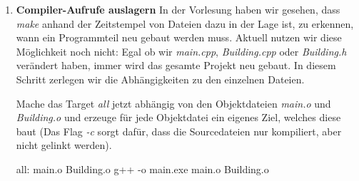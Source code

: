\begin{enumerate}
\begin{minipage}[t]{.45\textwidth}
\begin{lstlisting}
/*
* File: Building.h
*/
#ifndef BUILDING_H_
#define BUILDING_H_

#include <string>

class Building {
public:
    Building(unsigned int numFloors);
    const std::string toString() const;
private:
    unsigned int numFloors;
};
#endif
\end{lstlisting}
\end{minipage}
\begin{minipage}[t]{.45\textwidth}
\begin{lstlisting}
/*
* File: Building.cpp
*/
#include "Building.h"

#include <string>
#include <sstream>

using namespace std;

Building::Building(unsigned int numFloors) :
    numFloors(numFloors) {}

const std::string Building::toString() const{
    stringstream output;
    output << "A building with "
           << this->numFloors
           << " floors\n";
    return output.str();
}
\end{lstlisting}
\end{minipage}

Erzeuge in \emph{main} eine zweistöckige Instanz von \emph{Building} und gib diese mittels \emph{Building::toString} auf der Konsole aus.

Damit das Projekt kompiliert, muss auch \emph{Building} im Makefile eingetragen werden.
Passe dazu den Compileraufruf an:
\begin{lstmake}
all:
    g++ -o main.exe main.cpp Building.cpp
\end{lstmake}

Wenn du das Projekt gebaut hast, sollte auf der Konsole eine Ausgabe deines Gebäudes erscheinen.

\item\textbf{Compiler-Aufrufe auslagern}
In der Vorlesung haben wir gesehen, dass \emph{make} anhand der Zeitstempel von Dateien dazu in der Lage ist, zu erkennen, wann ein Programmteil neu gebaut werden muss.
Aktuell nutzen wir diese Möglichkeit noch nicht:
Egal ob wir \emph{main.cpp}, \emph{Building.cpp} oder \emph{Building.h} verändert haben, immer wird das gesamte Projekt neu gebaut.
In diesem Schritt zerlegen wir die Abhängigkeiten zu den einzelnen Dateien.

Mache das Target \emph{all} jetzt abhängig von den Objektdateien \emph{main.o} und \emph{Building.o} und erzeuge für jede Objektdatei ein eigenes Ziel, welches diese baut (Das Flag \emph{-c} sorgt dafür, dass die Sourcedateien nur kompiliert, aber nicht gelinkt werden).
\begin{lstmake}
all: main.o Building.o
	g++ -o main.exe main.o Building.o


\end{lstmake}
\end{enumerate}

